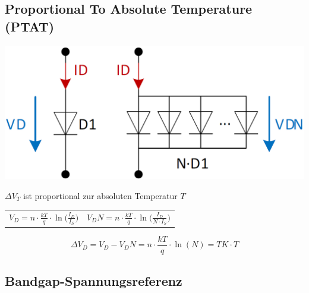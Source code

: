 \subsection{Proportional To Absolute Temperature (PTAT)}

\begin{minipage}[c]{0.28\columnwidth}
    \includegraphics[width=\columnwidth]{images/ptat.png}
\end{minipage}
\hfill
\begin{minipage}[c]{0.7\columnwidth}
    \textrightarrow $\Delta V_T$ ist proportional zur absoluten Temperatur $T$
\end{minipage}

    \begin{tabular}{@{}c c@{}}
        $V_D = n \cdot \frac{k T}{q} \cdot \ln \Big( \frac{I_D}{I_S} \Big)$ & 
        $V_DN = n \cdot \frac{k T}{q} \cdot \ln \Big( \frac{I_D}{N \cdot I_S} \Big)$
    \end{tabular}

    $$ \boxed{ \Delta V_D = V_D - V_DN = n \cdot \frac{k T}{q} \cdot \ln(N)  = TK \cdot T }$$


\subsection{Bandgap-Spannungsreferenz}


